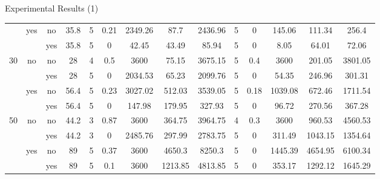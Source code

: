 \documentclass[slidestop,usepdftitle=false,10pt]{beamer}
\begin{document}
\begin{frame}{Experimental Results (1)}
\begin{table}[htbp]
{\begin{tabular}{cccc|ccccc|ccccc|}
				\cline{2-14}      & \multirow{2}[2]{*}{yes} & no & 35.8 & 5 & 0.21 & 2349.26 & 87.7 & 2436.96 & 5 & 0 & 145.06 & 111.34 & 256.4 \bigstrut[t]\\
				&   & yes & 35.8 & 5 & 0 & 42.45 & 43.49 & 85.94 & 5 & 0 & 8.05 & 64.01 & 72.06 \bigstrut[b]\\
				\hline
				\multirow{4}[4]{*}{30} & \multirow{2}[2]{*}{no} & no & 28 & 4 & 0.5 & 3600 & 75.15 & 3675.15 & 5 & 0.4 & 3600 & 201.05 & 3801.05 \bigstrut[t]\\
				&   & yes & 28 & 5 & 0 & 2034.53 & 65.23 & 2099.76 & 5 & 0 & 54.35 & 246.96 & 301.31 \bigstrut[b]\\
				\cline{2-14}      & \multirow{2}[2]{*}{yes} & no & 56.4 & 5 & 0.23 & 3027.02 & 512.03 & 3539.05 & 5 & 0.18 & 1039.08 & 672.46 & 1711.54 \bigstrut[t]\\
				&   & yes & 56.4 & 5 & 0 & 147.98 & 179.95 & 327.93 & 5 & 0 & 96.72 & 270.56 & 367.28 \bigstrut[b]\\
				\hline
				\multirow{4}[4]{*}{50} & \multirow{2}[2]{*}{no} & no & 44.2 & 3 & 0.87 & 3600 & 364.75 & 3964.75 & 4 & 0.3 & 3600 & 960.53 & 4560.53 \bigstrut[t]\\
				&   & yes & 44.2 & 3 & 0 & 2485.76 & 297.99 & 2783.75 & 5 & 0 & 311.49 & 1043.15 & 1354.64 \bigstrut[b]\\
				\cline{2-14}      & \multirow{2}[2]{*}{yes} & no & 89 & 5 & 0.37 & 3600 & 4650.3 & 8250.3 & 5 & 0 & 1445.39 & 4654.95 & 6100.34 \bigstrut[t]\\
				&   & yes & 89 & 5 & 0.1 & 3600 & 1213.85 & 4813.85 & 5 & 0 & 353.17 & 1292.12 & 1645.29 \bigstrut[b]\\
				\hline
		\end{tabular}}%
		\label{table:results}%
	\end{table}%
	
	\end{frame}
\end{document}
